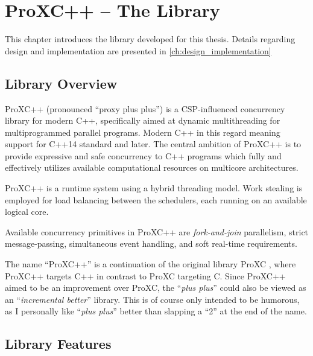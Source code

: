 
\chapter{ProXC++ -- The Library}
\label{ch:proxc_library}

This chapter introduces the library developed for this thesis. Details regarding design and implementation are presented in \cref{ch:design_implementation}


\section{Library Overview}
\label{sec:library_overview}

ProXC++ (pronounced ``proxy plus plus'') is a CSP\hyp{}influenced concurrency library for modern C++, specifically aimed at dynamic multithreading for multiprogrammed parallel programs. Modern C++ in this regard meaning support for C++14 standard and later. The central ambition of ProXC++ is to provide expressive and safe concurrency to C++ programs which fully and effectively utilizes available computational resources on multicore architectures.

ProXC++ is a runtime system using a hybrid threading model. Work stealing is employed for load balancing between the schedulers, each running on an available logical core. 

Available concurrency primitives in ProXC++ are \textit{fork\hyp{}and\hyp{}join} parallelism, strict message\hyp{}passing, simultaneous event handling, and soft real\hyp{}time requirements.

The name ``ProXC++'' is a continuation of the original library ProXC \citep{pettersen2016proxc}, where ProXC++ targets C++ in contrast to ProXC targeting C. Since ProXC++ aimed to be an improvement over ProXC, the ``\textit{plus plus}'' could also be viewed as an ``\textit{incremental better}'' library. This is of course only intended to be humorous, as I personally like ``\textit{plus plus}'' better than slapping a ``2'' at the end of the name.


\section{Library Features}
\label{sec:library_features}

